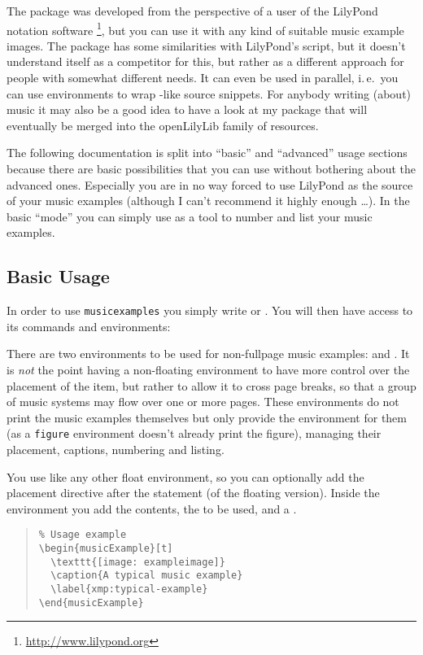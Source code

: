 \documentclass[../openLilyLib]{subfiles}
\begin{document}
The package was developed from the perspective of a user of the LilyPond notation software%
\footnote{\url{http://www.lilypond.org}}, but you can use it with any kind of suitable music example images.
The package has some similarities with LilyPond's  script, but it doesn't understand itself as a competitor for this, but rather as a different approach for people with somewhat different needs.
It can even be used in parallel, i.\,e.\ you can use  environments to wrap -like source snippets.
For anybody writing (about) music it may also be a good idea to have a look at my  package that will eventually be merged into the openLilyLib family of resources.

The following documentation is split into “basic” and “advanced” usage sections because there are basic possibilities that you can use without bothering about the advanced ones.
Especially you are in no way forced to use LilyPond as the source of your music examples (although I can't recommend it highly enough \dots).
In the basic “mode” you can simply use  as a tool to number and list your music examples.

\subsection{Basic Usage}
\label{subsec:xmp_basic-usage}
In order to use \texttt{musicexamples} you simply write  or .
You will then have access to its commands and environments:

There are two environments to be used for non-fullpage music examples:  and .
It is \emph{not} the point having a non-floating environment to have more control over the placement of the item, but rather to allow it to cross page breaks, so that a group of music systems may flow over one or more pages. 
These environments do not print the music examples themselves but only provide the environment for them (as a \texttt{figure} environment doesn't already print the figure), managing their placement, captions, numbering and listing.

You use  like any other float environment, so you can optionally add the placement directive after the  statement (of the floating version).
Inside the environment you add the contents, the  to be used, and a .
\begin{quote}
\begin{verbatim}
% Usage example
\begin{musicExample}[t]
  \texttt{[image: exampleimage]}
  \caption{A typical music example}
  \label{xmp:typical-example}
\end{musicExample}
\end{verbatim}
\end{quote}
\end{document}
